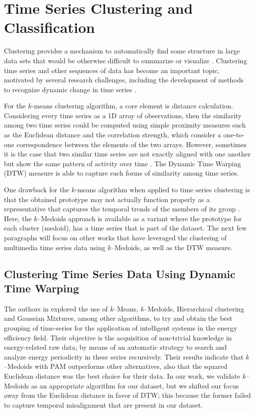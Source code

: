 \section{Time Series Clustering and Classification}
\label{Sec:ClusteringRelatedWorks}

Clustering provides a mechanism to automatically find some structure in large data sets that would be otherwise difficult to summarize or visualize \cite{Aggarwal2013}. Clustering time series and other sequences of data has become an important topic, motivated by several research challenges, including the development of methods to recognize dynamic change in time series \cite{Wang2004}. 

For the $k$-means clustering algorithm, a core element is distance calculation. Considering every time series as a 1D array of observations, then the similarity among two time series could be computed using simple proximity measures such as the Euclidean distance and the correlation strength, which consider a one-to-one correspondence between the elements of the two arrays. However, sometimes it is the case that two similar time series are not exactly aligned with one another but show the same pattern of activity over time \cite{Fu2011}. The Dynamic Time Warping (DTW) \cite{Sakoe1978} measure is able to capture such forms of similarity among time series. 

One drawback for the $k$-means algorithm when applied to time series clustering is that the obtained prototype may not actually function properly as a representative that captures the temporal trends of the members of its group \cite{Aghabozorgi2015}. Here, the $k$--Medoids approach is available as a variant where the prototype for each cluster (medoid), has a time series that is part of the dataset. %
The next few paragraphs will focus on other works that have leveraged the clustering of multimedia time series data using $k$--Medoids, as well as the DTW measure.

\subsection{Clustering Time Series Data Using Dynamic Time Warping}

The authors in \cite{Ruiz2020} explored the use of $k$--Means, $k$--Medoids, Hierarchical clustering and Gaussian Mixtures, among other algorithms, to try and obtain the best grouping of time-series for the application of intelligent systems in the energy efficiency field. Their objective is the acquisition of non-trivial knowledge in energy-related raw data, by means of an automatic strategy to search and analyze energy periodicity in these series recursively. Their results indicate that $k$--Medoids with PAM outperforms other alternatives, also that the squared Euclidean distance was the best choice for their data. In our work, we validate $k$--Medoids as an appropriate algorithm for our dataset, but we shifted our focus away from the Euclidean distance in favor of DTW; this because the former failed to capture temporal misalignment that are present in our dataset.

